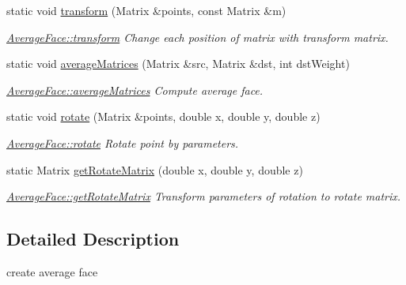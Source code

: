 \begin{DoxyCompactItemize}
static void \hyperlink{class_average_face_a89f22579a333bc0600f59732955f26c9}{transform} (Matrix \&points, const Matrix \&m)
\begin{DoxyCompactList}\small\item\em \hyperlink{class_average_face_a30a72616982800ec918615a6f63d0afe}{Average\+Face\+::transform} Change each position of matrix with transform matrix. \end{DoxyCompactList}\item 
static void \hyperlink{class_average_face_a3682002dda9f6965cda4cdb47392d348}{average\+Matrices} (Matrix \&src, Matrix \&dst, int dst\+Weight)
\begin{DoxyCompactList}\small\item\em \hyperlink{class_average_face_a3682002dda9f6965cda4cdb47392d348}{Average\+Face\+::average\+Matrices} Compute average face. \end{DoxyCompactList}\item 
static void \hyperlink{class_average_face_aae9a031c301124801955737081cc17ae}{rotate} (Matrix \&points, double x, double y, double z)
\begin{DoxyCompactList}\small\item\em \hyperlink{class_average_face_aae9a031c301124801955737081cc17ae}{Average\+Face\+::rotate} Rotate point by parameters. \end{DoxyCompactList}\item 
static Matrix \hyperlink{class_average_face_aed229b19ea1c7ee85ecb3dee76518b3d}{get\+Rotate\+Matrix} (double x, double y, double z)
\begin{DoxyCompactList}\small\item\em \hyperlink{class_average_face_aed229b19ea1c7ee85ecb3dee76518b3d}{Average\+Face\+::get\+Rotate\+Matrix} Transform parameters of rotation to rotate matrix. \end{DoxyCompactList}\end{DoxyCompactItemize}


\subsection{Detailed Description}
create average face 

